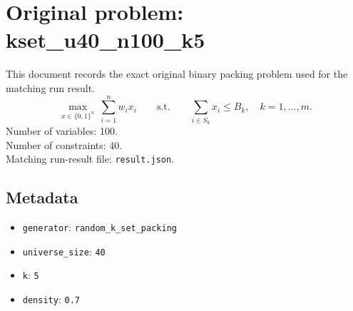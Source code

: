 \documentclass[11pt]{article}
\begin{document}
\section*{Original problem: kset\_u40\_n100\_k5}
This document records the exact original binary packing problem used for the matching run result.
\[
\max_{x\in\{0,1\}^n}\ \sum_{i=1}^n w_i x_i
\qquad\text{s.t.}\qquad
\sum_{i\in S_k} x_i \le B_k,\quad k=1,\dots,m.
\]
Number of variables: 100.\\
Number of constraints: 40.\\
Matching run-result file: \texttt{result.json}.
\subsection*{Metadata}
\begin{itemize}
\item \texttt{generator}: \texttt{random\_k\_set\_packing}
\item \texttt{universe\_size}: \texttt{40}
\item \texttt{k}: \texttt{5}
\item \texttt{density}: \texttt{0.7}
\end{itemize}
\end{document}
